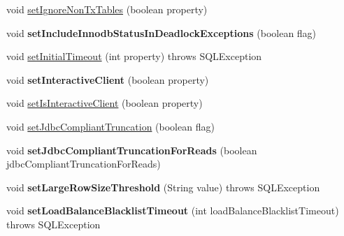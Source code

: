 \begin{DoxyCompactItemize}
\item 
void \mbox{\hyperlink{classcom_1_1mysql_1_1jdbc_1_1_multi_host_my_s_q_l_connection_a027ef854c24322fe98bd80b458cb82d0}{set\+Ignore\+Non\+Tx\+Tables}} (boolean property)
\item 
\mbox{\label{classcom_1_1mysql_1_1jdbc_1_1_multi_host_my_s_q_l_connection_a8236ae1b1dbf751487123dde19fcf666}} 
void {\bfseries set\+Include\+Innodb\+Status\+In\+Deadlock\+Exceptions} (boolean flag)
\item 
void \mbox{\hyperlink{classcom_1_1mysql_1_1jdbc_1_1_multi_host_my_s_q_l_connection_aeab355b0e9150013c3690b5be17ea12e}{set\+Initial\+Timeout}} (int property)  throws S\+Q\+L\+Exception 
\item 
\mbox{\label{classcom_1_1mysql_1_1jdbc_1_1_multi_host_my_s_q_l_connection_a983c5b7aec9038ccd8bf89b7400a24d7}} 
void {\bfseries set\+Interactive\+Client} (boolean property)
\item 
void \mbox{\hyperlink{classcom_1_1mysql_1_1jdbc_1_1_multi_host_my_s_q_l_connection_ae0dcc145ddb08238e1cc8af9139af39f}{set\+Is\+Interactive\+Client}} (boolean property)
\item 
void \mbox{\hyperlink{classcom_1_1mysql_1_1jdbc_1_1_multi_host_my_s_q_l_connection_a21f38ef972c4b59de2b93cdc7549d634}{set\+Jdbc\+Compliant\+Truncation}} (boolean flag)
\item 
\mbox{\label{classcom_1_1mysql_1_1jdbc_1_1_multi_host_my_s_q_l_connection_a115e001299e63ca1cbf31ca54352f9f0}} 
void {\bfseries set\+Jdbc\+Compliant\+Truncation\+For\+Reads} (boolean jdbc\+Compliant\+Truncation\+For\+Reads)
\item 
\mbox{\label{classcom_1_1mysql_1_1jdbc_1_1_multi_host_my_s_q_l_connection_a072447569685730683aaed6fc9336bfa}} 
void {\bfseries set\+Large\+Row\+Size\+Threshold} (String value)  throws S\+Q\+L\+Exception 
\item 
\mbox{\label{classcom_1_1mysql_1_1jdbc_1_1_multi_host_my_s_q_l_connection_a796d5c6e7585de03e750d0ea9fadde2f}} 
void {\bfseries set\+Load\+Balance\+Blacklist\+Timeout} (int load\+Balance\+Blacklist\+Timeout)  throws S\+Q\+L\+Exception 

\end{DoxyCompactItemize}
